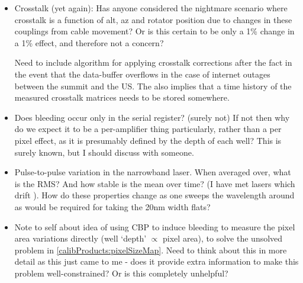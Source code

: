 \begin{itemize}
	\item Crosstalk (yet again): Has anyone considered the nightmare scenario where crosstalk is a function of alt, az and rotator position due to changes in these couplings from cable movement? Or is this certain to be only a 1\% change in a 1\% effect, and therefore not a concern? 
	
	\begin{note}
		Need to include algorithm for applying crosstalk corrections after the fact in the event that the data-buffer overflows in the case of internet outages between the summit and the US. The also implies that a time history of the measured crosstalk matrices needs to be stored somewhere.
	\end{note}
		
	\item Does bleeding occur only in the serial register? (surely not) If not then why do we expect it to be a per-amplifier thing particularly, rather than a per pixel effect, as it is presumably defined by the depth of each well? This is surely known, but I should discuss with someone. 
	
	\item Pulse-to-pulse variation in the narrowband laser. When averaged over, what is the RMS? And how stable is the mean over time? (I have met lasers which drift ). How do these properties change as one sweeps the wavelength around as would be required for taking the 20nm width flats?
	
	\item Note to self about idea of using CBP to induce bleeding to measure the pixel area variations directly (well `depth' $\propto$ pixel area), to solve the unsolved problem in \secsymbol\ref{calibProducts:pixelSizeMap}. Need to think about this in more detail as this just came to me - does it provide extra information to make this problem well-constrained? Or is this completely unhelpful?
\end{itemize}






